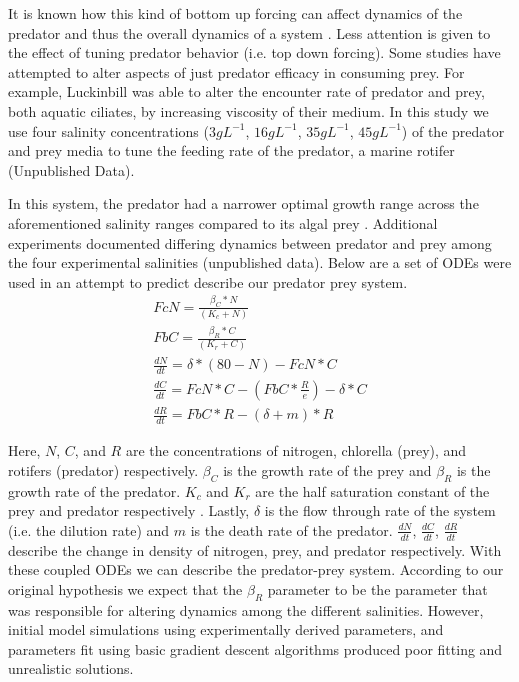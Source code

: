 \documentclass[twocolumn, 9pt]{article}
\begin{document}
\indent{} It is known how this kind of bottom up forcing can affect dynamics of the predator and thus the overall dynamics of a system \cite{smith_rosenzweig-macarthur_nodate, mccauley_physiological_1990, mccauley_growth_1990, mccauley_cyclic_1987, mccauley_large-amplitude_1999}. Less attention is given to the effect of tuning predator behavior (i.e. top down forcing). Some studies have attempted to alter aspects of just predator efficacy in consuming prey. For example, Luckinbill \cite{luckinbill_coexistence_1973, luckinbill_effects_1974} was able to alter the encounter rate of predator and prey, both aquatic ciliates, by increasing viscosity of their medium. In this study we use four salinity concentrations ($3 gL^{-1}$, $16 gL^{-1}$, $35 gL^{-1}$, $45 gL^{-1}$) of the predator and prey media to tune the feeding rate of the predator, a marine rotifer (Unpublished Data). 

\indent{} In this system, the predator had a narrower optimal growth range across the aforementioned salinity ranges compared to its algal prey \cite{snell_effect_1986, sarma_effect_nodate, miracle_salinity_nodate}. Additional experiments documented differing dynamics between predator and prey among the four experimental salinities (unpublished data).
Below are a set of ODEs were used in an attempt to predict describe our predator prey system. \\
\begin{align}
    FcN = \frac{\beta_C*N}{(K_c+N)} \\
    FbC = \frac{\beta_R*C}{(K_r+C)} \\
    \frac{dN}{dt}=\delta*(80-N)-FcN*C \\
    \frac{dC}{dt}=FcN*C-(FbC*\frac{R}{e})-\delta*C \\
    \frac{dR}{dt}=FbC*R-(\delta+m)*R 
\end{align}

\indent{} Here, $N$, $C$, and $R$ are the concentrations of nitrogen, chlorella (prey), and rotifers (predator) respectively. $\beta_C$ is the growth rate of the prey and $\beta_R$ is the growth rate of the predator. $K_c$ and $K_r$ are the half saturation constant of the prey and predator respectively \cite{fussmann_crossing_2000}. Lastly, $\delta$ is the flow through rate of the system (i.e. the dilution rate) and $m$ is the death rate of the predator. $\frac{dN}{dt}$, $\frac{dC}{dt}$, $\frac{dR}{dt}$ describe the change in density of nitrogen, prey, and predator respectively. With these coupled ODEs we can describe the predator-prey system. According to our original hypothesis we expect that the $\beta_R$ parameter to be the parameter that was responsible for altering dynamics among the different salinities. However, initial model simulations using experimentally derived parameters, and parameters fit using basic gradient descent algorithms produced poor fitting and unrealistic solutions.  
\end{document}
